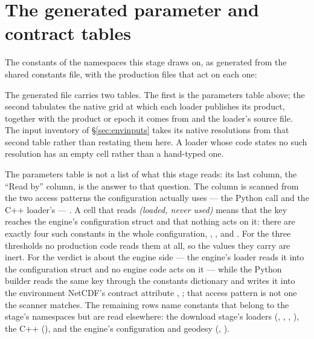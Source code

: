 \documentclass[11pt,a4paper]{article} \usepackage[utf8]{inputenc} \usepackage{lmodern} \usepackage[T1]{fontenc}
\begin{document}
\section{The generated parameter and contract tables} \label{sec:contracts}

The constants of the namespaces this stage draws on, as generated from the shared constants
file, with the production files that act on each one:



\smallskip \noindent The generated file carries two tables. The first is the parameters table
above; the second tabulates the native grid at which each loader publishes its product,
together with the product or epoch it comes from and the loader's source file. The input
inventory of \S\ref{sec:envinputs} takes its native resolutions from that second table rather
than restating them here. A loader whose code states no such resolution has an empty cell
rather than a hand-typed one.

\smallskip \noindent The parameters table is not a list of what this stage reads: its last
column, the
``Read by'' column, is the answer to that question. The column is scanned from the two access
patterns the configuration actually uses --- the Python  call and the C++ loader's  ---
. A cell that reads \emph{(loaded, never used)}
means that the key reaches the engine's configuration struct and that nothing acts on it: there
are exactly four such constants in the whole configuration,
, ,
 and . For the three 
thresholds no production code reads them at all, so the values they carry are inert. For
 the verdict is about the engine side --- the engine's loader reads it
into the configuration struct
 and no engine code acts on it --- while
the Python builder reads the same key through the constants dictionary and writes it into the
environment NetCDF's contract attribute
,
; that access pattern is not one the
scanner matches. The remaining rows name constants that belong to the stage's namespaces but
are read elsewhere: the download stage's loaders (,
, ,
), the C++ 
(), and the engine's configuration and geodesy
(, ).
\end{document}
